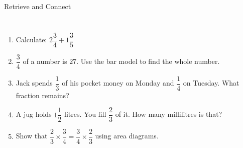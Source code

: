 \documentclass{beamer}
\newcommand{\ashow}[1]{\uncover<2->{\textcolor{red}{\small #1}}}
\begin{document}
\begin{frame}{Retrieve and Connect}
\begin{columns}
\begin{enumerate}
  \item Calculate: $2\dfrac{3}{4} + 1\dfrac{3}{5}$ \ashow{$=4\dfrac{7}{20}$}

  \item $\dfrac{3}{4}$ of a number is $27$. Use the bar model to find the whole number. \ashow{$36$}

  \item Jack spends $\dfrac{1}{3}$ of his pocket money on Monday and $\dfrac{1}{4}$ on Tuesday. What fraction remains? \ashow{$\dfrac{5}{12}$}

  \item A jug holds $1\dfrac{1}{2}$ litres. You fill $\dfrac{2}{3}$ of it. How many millilitres is that? \ashow{$1000$ mL}

  \item Show that $\dfrac{2}{3} \times \dfrac{3}{4} = \dfrac{3}{4} \times \dfrac{2}{3}$ using area diagrams.


\end{enumerate}
\end{columns}
\end{frame}
\end{document}
